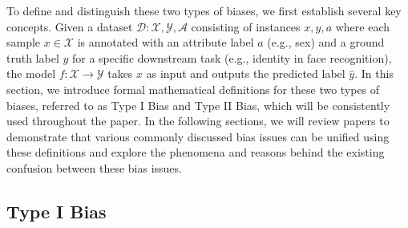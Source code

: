 \label{sec:definition}








To define and distinguish these two types of biases, we first establish several key concepts. Given a dataset $\mathcal{D}: {\mathcal{X}, \mathcal{Y}, \mathcal{A}}$ consisting of instances ${x, y, a}$ where each sample $x \in \mathcal{X}$ is annotated with an attribute label $a$ (e.g., sex) and a ground truth label $y$ for a specific downstream task (e.g., identity in face recognition), the model $f: \mathcal{X} \to \mathcal{Y}$ takes $x$ as input and outputs the predicted label $\hat{y}$.
In this section, we introduce formal mathematical definitions for these two types of biases, referred to as Type I Bias and Type II Bias, which will be consistently used throughout the paper. In the following sections, we will review \pc papers to demonstrate that various commonly discussed bias issues can be unified using these definitions and explore the phenomena and reasons behind the existing confusion between these bias issues.






































\subsection{Type I Bias} 



